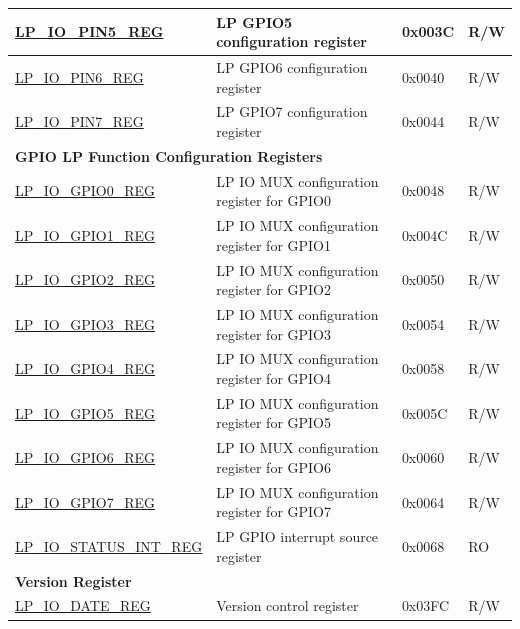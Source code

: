 \begin{longtable}{ | p{6.2cm} | p{7cm} | p{1.3cm} | p{1cm} | }
\hyperref[regdesc:LPIOPINNREG]{LP\_IO\_PIN5\_REG} & LP GPIO5 configuration register & 0x003C & R/W \\ \hline
\hyperref[regdesc:LPIOPINNREG]{LP\_IO\_PIN6\_REG} & LP GPIO6 configuration register & 0x0040 & R/W \\ \hline
\hyperref[regdesc:LPIOPINNREG]{LP\_IO\_PIN7\_REG} & LP GPIO7 configuration register & 0x0044 & R/W \\ \hline
\multicolumn{4}{|l|}{\textbf{GPIO LP Function Configuration Registers}} \\ \hline
\hyperref[regdesc:LPIOGPIONREG]{LP\_IO\_GPIO0\_REG} & LP IO MUX configuration register for GPIO0 & 0x0048 & R/W \\ \hline
\hyperref[regdesc:LPIOGPIONREG]{LP\_IO\_GPIO1\_REG} & LP IO MUX configuration register for GPIO1 & 0x004C & R/W \\ \hline
\hyperref[regdesc:LPIOGPIONREG]{LP\_IO\_GPIO2\_REG} & LP IO MUX configuration register for GPIO2 & 0x0050 & R/W \\ \hline
\hyperref[regdesc:LPIOGPIONREG]{LP\_IO\_GPIO3\_REG} & LP IO MUX configuration register for GPIO3 & 0x0054 & R/W \\ \hline
\hyperref[regdesc:LPIOGPIONREG]{LP\_IO\_GPIO4\_REG} & LP IO MUX configuration register for GPIO4 & 0x0058 & R/W \\ \hline
\hyperref[regdesc:LPIOGPIONREG]{LP\_IO\_GPIO5\_REG} & LP IO MUX configuration register for GPIO5 & 0x005C & R/W \\ \hline
\hyperref[regdesc:LPIOGPIONREG]{LP\_IO\_GPIO6\_REG} & LP IO MUX configuration register for GPIO6 & 0x0060 & R/W \\ \hline
\hyperref[regdesc:LPIOGPIONREG]{LP\_IO\_GPIO7\_REG} & LP IO MUX configuration register for GPIO7 & 0x0064 & R/W \\ \hline
\hyperref[regdesc:LPIOSTATUSINTREG]{LP\_IO\_STATUS\_INT\_REG} & LP GPIO interrupt source register & 0x0068 & RO \\ \hline
\multicolumn{4}{|l|}{\textbf{Version Register}} \\ \hline
\hyperref[regdesc:LPIODATEREG]{LP\_IO\_DATE\_REG} & Version control register & 0x03FC & R/W \\ \hline
\end{longtable}

